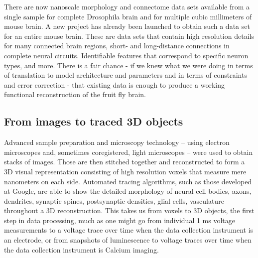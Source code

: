 \documentclass{ldr-article}
\begin{document}
There are now nanoscale morphology and connectome data sets available from a single sample for complete Drosophila brain and for multiple cubic millimeters of mouse brain.
A new project has already been launched to obtain such a data set for an entire mouse brain.
These are data sets that contain high resolution details for many connected brain regions, short- and long-distance connections in complete neural circuits.
Identifiable features that correspond to specific neuron types, and more.
There is a fair chance - if we knew what we were doing in terms of translation to model architecture and parameters and in terms of constraints and error correction - that existing data is enough to produce a working functional reconstruction of the fruit fly brain.

\subsection{From images to traced 3D objects}

Advanced sample preparation and microscopy technology – using electron microscopes and, sometimes coregistered, light microscopes – were used to obtain stacks of images.
Those are then stitched together and reconstructed to form a 3D visual representation consisting of high resolution voxels that measure mere nanometers on each side.
Automated tracing algorithms, such as those developed at Google, are able to show the detailed morphology of neural cell bodies, axons, dendrites, synaptic spines, postsynaptic densities, glial cells, vasculature throughout a 3D reconstruction.
This takes us from voxels to 3D objects, the first step in data processing, much as one might go from individual 1 ms voltage measurements to a voltage trace over time when the data collection instrument is an electrode, or from snapshots of luminescence to voltage traces over time when the data collection instrument is Calcium imaging.


\end{document}
